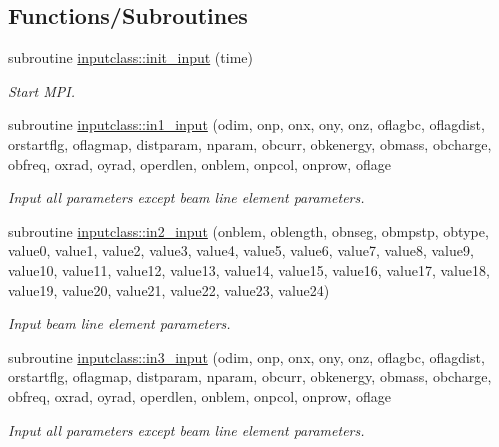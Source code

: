 \subsection*{Functions/\+Subroutines}
\begin{DoxyCompactItemize}
\item 
subroutine \mbox{\hyperlink{namespaceinputclass_ae7866a50f5576b1fea0aa1b10f98690b}{inputclass\+::init\+\_\+input}} (time)
\begin{DoxyCompactList}\small\item\em Start M\+PI. \end{DoxyCompactList}\item 
subroutine \mbox{\hyperlink{namespaceinputclass_a907319f6e5d34930fbc63f5af426e9bd}{inputclass\+::in1\+\_\+input}} (odim, onp, onx, ony, onz, oflagbc, oflagdist, orstartflg, oflagmap, distparam, nparam, obcurr, obkenergy, obmass, obcharge, obfreq, oxrad, oyrad, operdlen, onblem, onpcol, onprow, oflage
\begin{DoxyCompactList}\small\item\em Input all parameters except beam line element parameters. \end{DoxyCompactList}\item 
subroutine \mbox{\hyperlink{namespaceinputclass_a943f99f8cd6dc0476378072a9d4d27cd}{inputclass\+::in2\+\_\+input}} (onblem, oblength, obnseg, obmpstp, obtype, value0, value1, value2, value3, value4, value5, value6, value7, value8, value9, value10, value11, value12, value13, value14, value15, value16, value17, value18, value19, value20, value21, value22, value23, value24)
\begin{DoxyCompactList}\small\item\em Input beam line element parameters. \end{DoxyCompactList}\item 
subroutine \mbox{\hyperlink{namespaceinputclass_af6c761d115ea894925da33378b4bdf7d}{inputclass\+::in3\+\_\+input}} (odim, onp, onx, ony, onz, oflagbc, oflagdist, orstartflg, oflagmap, distparam, nparam, obcurr, obkenergy, obmass, obcharge, obfreq, oxrad, oyrad, operdlen, onblem, onpcol, onprow, oflage
\begin{DoxyCompactList}\small\item\em Input all parameters except beam line element parameters. \end{DoxyCompactList}\end{DoxyCompactItemize}
